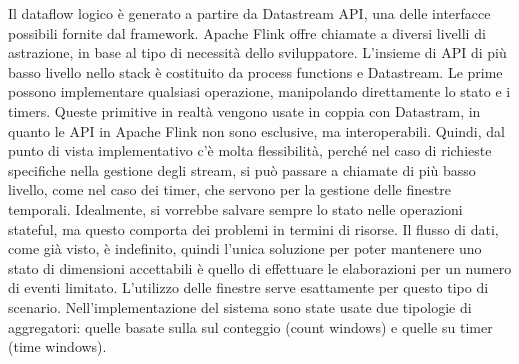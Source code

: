 Il dataflow logico è generato a partire da Datastream API, una delle interfacce possibili fornite dal framework. Apache Flink offre chiamate a diversi livelli di astrazione, in base al tipo di necessità dello sviluppatore. L'insieme di API di più basso livello nello stack è costituito da process functions e Datastream. Le prime possono implementare qualsiasi operazione, manipolando direttamente lo stato e i timers. Queste primitive in realtà vengono usate in coppia con Datastram, in quanto le API in Apache Flink non sono esclusive, ma interoperabili. Quindi, dal punto di vista implementativo c'è molta flessibilità, perché nel caso di richieste specifiche nella gestione degli stream, si può passare a chiamate di più basso livello, come nel caso dei timer, che servono per la gestione delle finestre temporali. Idealmente, si vorrebbe salvare sempre lo stato nelle operazioni stateful, ma questo comporta dei problemi in termini di risorse. Il flusso di dati, come già visto, è indefinito, quindi l'unica soluzione per poter mantenere uno stato di dimensioni accettabili è quello di effettuare le elaborazioni per un numero di eventi limitato. L'utilizzo delle finestre serve esattamente per questo tipo di scenario. Nell'implementazione del sistema sono state usate due tipologie di aggregatori: quelle basate sulla sul conteggio (count windows) e quelle su timer (time windows). %


 


     



